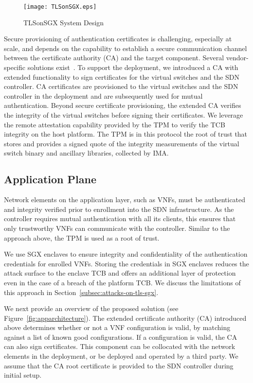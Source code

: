 {\begin{figure}[t] 
\centering
\texttt{[image: TLSonSGX.eps]}
\caption{TLSonSGX System Design}
\label{fig:tlsonsgx}
\end{figure}

Secure provisioning of authentication certificates is challenging, especially at scale, and depends on the capability to establish a secure communication channel between the certificate authority (CA) and the target component.
Several vendor-specific solutions exist~\cite{mckeen:2013,jain:2016}.
To support the deployment, we introduced a CA with extended functionality to sign certificates for the virtual switches and the SDN controller.
CA certificates are provisioned to the virtual switches and the SDN controller in the deployment and are subsequently used for mutual authentication.
Beyond secure certificate provisioning, the extended CA verifies the integrity of the virtual switches before signing their certificates.
We leverage the remote attestation capability provided by the TPM to verify the TCB integrity on the host platform.
The TPM is in this protocol the root of trust that stores and provides a signed quote of the integrity measurements of the virtual switch binary and ancillary libraries, collected by IMA.

\subsection{Application Plane}
\label{subsec:application-plane-trust}
Network elements on the application layer, such as VNFs, must be authenticated and integrity verified prior to enrollment into the SDN infrastructure.
As the controller requires mutual authentication with all its clients, this ensures that only trustworthy VNFs can communicate with the controller.
Similar to the approach above, the TPM is used as a root of trust.%

We use SGX enclaves to ensure integrity and confidentiality of the authentication credentials for enrolled VNFs.
Storing the credentials in SGX enclaves reduces the attack surface to the enclave TCB and offers an additional layer of protection even in the case of a breach of the platform TCB.
We discuss the limitations of this approach in Section~\ref{subsec:attacks-on-tls-sgx}.

We next provide an overview of the proposed solution (see Figure~\ref{fig:apparchitecture}).
The extended certificate authority (CA) introduced above determines whether or not a VNF configuration is valid, by matching against a list of known good configurations.
If a configuration is valid, the CA can also sign certificates.
This component can be collocated with the network elements in the deployment, or be deployed and operated by a third party.
We assume that the CA root certificate is provided to the SDN controller during initial setup.

}
